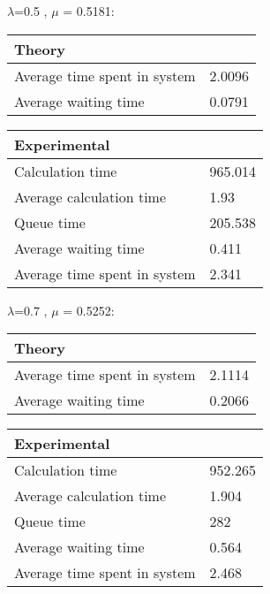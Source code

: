 \begin{minipage}{\linewidth}
   $\lambda$=0.5 , $\mu$ = 0.5181:

    \bigskip
    \begin{minipage}{0.45\linewidth}
        \begin{tabular}{|l|l|}
            \hline
            Theory & \\
            \hline
            Average time spent in system & 2.0096 \\
            Average waiting time & 0.0791 \\
            \hline
        \end{tabular}
    \end{minipage}
    \begin{minipage}{0.45\linewidth}
        \begin{tabular}{|l|l|}
            \hline
            Experimental & \\
            \hline
            Calculation time & 965.014 \\
            Average calculation time & 1.93 \\
            Queue time & 205.538 \\
            Average waiting time & 0.411 \\
            Average time spent in system & 2.341 \\
            \hline
        \end{tabular}
    \end{minipage}
    \bigskip
\end{minipage}

\begin{minipage}{\linewidth}
   $\lambda$=0.7 , $\mu$ = 0.5252:

    \bigskip
    \begin{minipage}{0.45\linewidth}
        \begin{tabular}{|l|l|}
            \hline
            Theory & \\
            \hline
            Average time spent in system & 2.1114 \\
            Average waiting time & 0.2066 \\
            \hline
        \end{tabular}
    \end{minipage}
    \begin{minipage}{0.45\linewidth}
        \begin{tabular}{|l|l|}
            \hline
            Experimental & \\
            \hline
            Calculation time & 952.265 \\
            Average calculation time & 1.904 \\
            Queue time & 282 \\
            Average waiting time & 0.564 \\
            Average time spent in system & 2.468 \\
            \hline
        \end{tabular}
    \end{minipage}
    \bigskip
\end{minipage}

